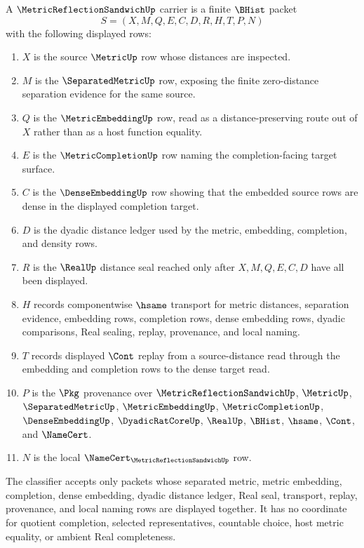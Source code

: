 \begin{definition}
\label{def:metric-reflection-sandwich-carrier}
A $\MetricReflectionSandwichUp$ carrier is a finite $\BHist$ packet
$$
S=(X,M,Q,E,C,D,R,H,T,P,N)
$$
with the following displayed rows:
\begin{enumerate}
\item $X$ is the source $\MetricUp$ row whose distances are inspected.
\item $M$ is the $\SeparatedMetricUp$ row, exposing the finite zero-distance separation evidence for the same source.
\item $Q$ is the $\MetricEmbeddingUp$ row, read as a distance-preserving route out of $X$ rather than as a host function equality.
\item $E$ is the $\MetricCompletionUp$ row naming the completion-facing target surface.
\item $C$ is the $\DenseEmbeddingUp$ row showing that the embedded source rows are dense in the displayed completion target.
\item $D$ is the dyadic distance ledger used by the metric, embedding, completion, and density rows.
\item $R$ is the $\RealUp$ distance seal reached only after $X,M,Q,E,C,D$ have all been displayed.
\item $H$ records componentwise $\hsame$ transport for metric distances, separation evidence, embedding rows, completion rows, dense embedding rows, dyadic comparisons, Real sealing, replay, provenance, and local naming.
\item $T$ records displayed $\Cont$ replay from a source-distance read through the embedding and completion rows to the dense target read.
\item $P$ is the $\Pkg$ provenance over $\MetricReflectionSandwichUp$, $\MetricUp$, $\SeparatedMetricUp$, $\MetricEmbeddingUp$, $\MetricCompletionUp$, $\DenseEmbeddingUp$, $\DyadicRatCoreUp$, $\RealUp$, $\BHist$, $\hsame$, $\Cont$, and $\NameCert$.
\item $N$ is the local $\NameCert_{\MetricReflectionSandwichUp}$ row.
\end{enumerate}
The classifier accepts only packets whose separated metric, metric embedding, completion, dense embedding, dyadic distance ledger, Real seal, transport, replay, provenance, and local naming rows are displayed together. It has no coordinate for quotient completion, selected representatives, countable choice, host metric equality, or ambient Real completeness.
\end{definition}

